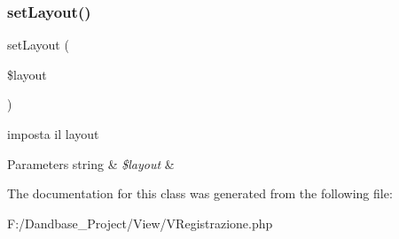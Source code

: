 \subsubsection{\texorpdfstring{set\+Layout()}{setLayout()}}
{\footnotesize\ttfamily set\+Layout (\begin{DoxyParamCaption}\item[{}]{\$layout }\end{DoxyParamCaption})}

imposta il layout


\begin{DoxyParams}[1]{Parameters}
string & {\em \$layout} & \\
\hline
\end{DoxyParams}


The documentation for this class was generated from the following file\+:\begin{DoxyCompactItemize}
\item 
F\+:/\+Dandbase\+\_\+\+Project/\+View/V\+Registrazione.\+php\end{DoxyCompactItemize}
